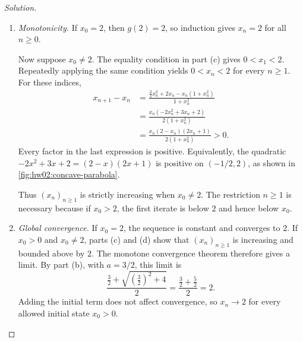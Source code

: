 \begin{proof}[Solution]
\begin{enumerate}
    \handoutonly{\newpage}

  \item \textit{Monotonicity.}
    If $x_0=2$, then $g(2)=2$, so induction gives $x_n=2$
    for all $n\geq0$.

    Now suppose $x_0\ne2$. The equality condition in part (c)
    gives $0<x_1<2$. Repeatedly applying the same condition yields
    $0<x_n<2$ for every $n\geq1$. For these indices,
    \[
      \begin{aligned}
        x_{n+1}-x_n
          &=\frac{\tfrac32x_n^2+2x_n-x_n(1+x_n^2)}{1+x_n^2}\\
          &=\frac{x_n(-2x_n^2+3x_n+2)}{2(1+x_n^2)}\\
          &=\frac{x_n(2-x_n)(2x_n+1)}{2(1+x_n^2)}>0.
      \end{aligned}
    \]
    Every factor in the last expression is positive. Equivalently,
    the quadratic $-2x^2+3x+2=(2-x)(2x+1)$ is positive on
    $(-1/2,2)$, as shown in \autoref{fig:hw02:concave-parabola}.
    \begin{marginfigure}
      \centering
      
      \caption[A quadratic positive between its roots.]{The quadratic $-2x^2+3x+2$ is positive between
        its roots $-1/2$ and $2$.}
      \label{fig:hw02:concave-parabola}
    \end{marginfigure}
    Thus $(x_n)_{n\geq1}$ is strictly increasing when $x_0\ne2$.
    The restriction $n\geq1$ is necessary because if $x_0>2$, the first
    iterate is below $2$ and hence below $x_0$.

  \item \textit{Global convergence.}
    If $x_0=2$, the sequence is constant and converges to $2$.
    If $x_0>0$ and $x_0\ne2$, parts (c) and (d) show that
    $(x_n)_{n\geq1}$ is increasing and bounded above by $2$.
    The monotone convergence theorem therefore gives a limit.
    By part (b), with $a=3/2$, this limit is
    \[
      \frac{\tfrac32+\sqrt{(\tfrac32)^2+4}}2
        =\frac{\tfrac32+\tfrac52}2=2.
    \]
    Adding the initial term does not affect convergence, so
    $x_n\to2$ for every allowed initial state $x_0>0$.
\end{enumerate}
\end{proof}
\endgroup
